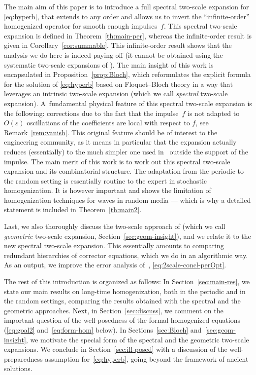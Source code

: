 \documentclass[JEP,XML,SOM,Unicode,published]{cedram}
\theoremstyle{plain}
\theoremstyle{definition}
\numberwithin{equation}{section}
\newcommand{\e}{\varepsilon}
\begin{document}
The main aim of this paper is to introduce a full spectral two-scale expansion for \eqref{eq:hyperb}, that extends \cite{BG} to any order and allows us to invert the ``infinite-order'' homogenized operator for smooth enough impulses~$f$.
This spectral two-scale expansion is defined in Theorem~\ref{th:main-per}, whereas the infinite-order result is given in Corollary~\ref{cor:summable}. This infinite-order result shows that the analysis we do here is indeed paying off (it cannot be obtained using the systematic two-scale expansions of \cite{ALR,Pouch-17,Pouch-19}).
The main insight of this work is encapsulated in Proposition~\ref{prop:Bloch}, which reformulates the
explicit formula for the solution of \eqref{eq:hyperb} based on Floquet--Bloch theory in a way that leverages an intrinsic two-scale expansion (which we call \emph{spectral} two-scale expansion).
A~fundamental physical feature of this spectral two-scale expansion is the following: corrections due to the fact that the impulse~$f$ is not adapted to $O(\e)$ oscillations of the coefficients
are local with respect to $f$,
see Remark~\ref{rem:vanish}. This original feature should be of interest to the engineering community, as it means in particular that the expansion actually reduces (essentially) to the much simpler one used in~\cite{BG} outside the support of the impulse.
The main merit of this work is to work out this spectral two-scale expansion and its combinatorial structure.
The adaptation from the periodic to the random setting is essentially routine to the expert in stochastic homogenization.
It is however important and shows the limitation of homogenization techniques for waves in random media --- which is why a detailed statement is included in Theorem~\ref{th:main2}.

Last,
we also thoroughly discuss the two-scale approach of \cite{ALR,Pouch-17,Pouch-19} (which we call \emph{geometric} two-scale expansion, \cf Section~\ref{sec:geom-insight}), and we relate it to the new spectral two-scale expansion. This essentially amounts to comparing
redundant hierarchies of corrector equations, which we do in an algorithmic way. As an output, we
improve the error analysis of~\cite{ALR,Pouch-17,Pouch-19}, \cf \eqref{eq:2scale-concl-perOpt}.

The rest of this introduction is organized as follows: In Section~\ref{sec:main-res}, we state our main results on long-time homogenization, both in the periodic and in the random settings, comparing the results obtained with the spectral and the geometric approaches.
Next, in Section~\ref{sec:discuss}, we comment on the important question of the well-posedness of the formal homogenized equations (\cf \eqref{eq:goal2} and~\eqref{eq:form-hom} below). In Sections~\ref{sec:Bloch} and~\ref{sec:geom-insight}, we motivate the special form of the spectral and the {geometric} two-scale expansions. We conclude in Section~\ref{sec:ill-posed} with a discussion of the well-preparedness assumption for~\eqref{eq:hyperb}, going beyond the framework of ancient solutions.
\end{document}
